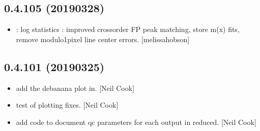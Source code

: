 \documentclass[a4paper,10pt,english]{report}
\begin{document}
\subsection{0.4.105 (2019\sphinxhyphen{}03\sphinxhyphen{}28)}
\label{\detokenize{misc/changelog:id177}}\begin{itemize}
\item {} 
: log statistics : improved cross\sphinxhyphen{}order FP
peak matching, store m(x) fits, remove modulo\sphinxhyphen{}1\sphinxhyphen{}pixel line center
errors. {[}melissa\sphinxhyphen{}hobson{]}

\end{itemize}


\subsection{0.4.101 (2019\sphinxhyphen{}03\sphinxhyphen{}25)}
\label{\detokenize{misc/changelog:id178}}\begin{itemize}
\item {} 
 \sphinxhyphen{} add the debanana plot in. {[}Neil Cook{]}

\item {} 
 \sphinxhyphen{} test of plotting fixes. {[}Neil Cook{]}

\item {} 
 \sphinxhyphen{} add code to document qc parameters for each output in
reduced. {[}Neil Cook{]}

\end{itemize}
\end{document}
